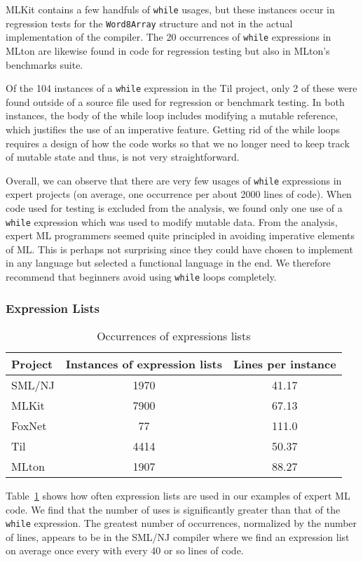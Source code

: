 \documentclass[12pt,abstracton]{scrartcl}
\begin{document}
MLKit contains a few handfuls of \texttt{while} usages, but these instances
occur in regression tests for the \texttt{Word8Array} structure and not in the actual implementation of the compiler.
The 20 occurrences of \texttt{while} expressions in MLton are likewise found in code for regression testing but
also in MLton's benchmarks suite.

Of the 104 instances of a \texttt{while} expression in the Til project,
only 2 of these were found outside of a source file used for regression or benchmark testing.
In both instances, the body of the while loop includes modifying a mutable reference, which justifies the use of
an imperative feature. Getting rid of the while loops requires a design of how the code works so
that we no longer need to keep track of mutable state and thus, is not very straightforward.

Overall, we can observe that there are very few usages of \texttt{while} expressions
in expert projects (on average, one occurrence per about 2000 lines of code).
When code used for testing is excluded from the analysis, we found only one use
of a \texttt{while} expression which was used to modify mutable data.
From the analysis, expert ML programmers seemed quite principled in avoiding imperative
elements of ML. This is perhaps not surprising since they could have chosen
to implement in any language but selected a functional language in the end.
We therefore recommend that beginners avoid using \texttt{while} loops completely.
\subsubsection{Expression Lists}
\begin{table}[h!]
\centering
\begin{tabular}{|l||c|c|}
\hline
Project & Instances of expression lists & Lines per instance \\ \hline\hline
SML/NJ & 1970 & 41.17 \\ 
MLKit & 7900 & 67.13 \\
FoxNet & 77 & 111.0 \\
Til & 4414 & 50.37 \\
MLton & 1907 & 88.27 \\ \hline
\end{tabular}
\caption{Occurrences of expressions lists}
\label{table:explist}
\end{table}
Table~\ref{table:explist} shows how often expression lists are used in our
examples of expert ML code. We find that the number of uses is significantly
greater than that of the \texttt{while} expression. The greatest number
of occurrences, normalized by the number of lines, appears to be in the SML/NJ
compiler where we find an expression list on average once every with every
40 or so lines of code.
\end{document}

